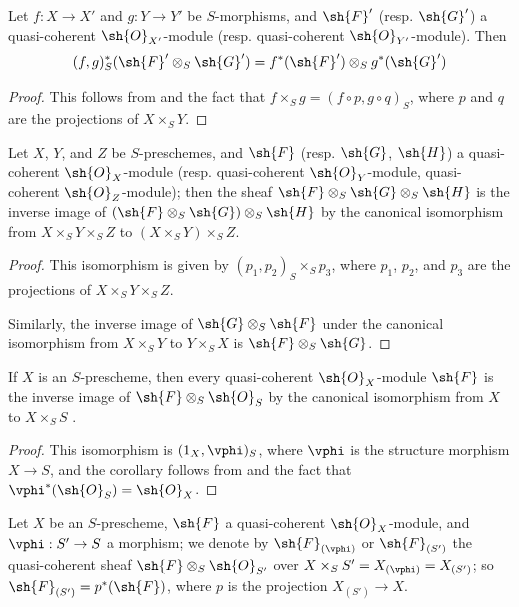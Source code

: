 \begin{corollary}[9.1.5]
\label{I.9.1.5}
Let $f:X\to X'$ and $g:Y\to Y'$ be
$S$-morphisms, and $\sh{F}'$ (resp. $\sh{G}'$) a quasi-coherent
$\sh{O}_{X'}$-module (resp. quasi-coherent $\sh{O}_{Y'}$-module). Then
\[
  (f,g)^*_S(\sh{F}'\otimes_S\sh{G}')=f^*(\sh{F}')\otimes_S g^*(\sh{G}')
\]
\end{corollary}

\begin{proof}
This follows from  and the fact that $f\times_S g=(f\circ p, g\circ q)_S$,
where $p$ and $q$ are the projections of $X\times_S Y$.
\end{proof}

\begin{corollary}[9.1.6]
\label{I.9.1.6}
Let $X$, $Y$, and $Z$ be $S$-preschemes, and $\sh{F}$ (resp. $\sh{G}$, $\sh{H}$) a
quasi-coherent $\sh{O}_X$-module (resp. quasi-coherent $\sh{O}_Y$-module, quasi-coherent
$\sh{O}_Z$-module); then the sheaf $\sh{F}\otimes_S\sh{G}\otimes_S\sh{H}$ is the inverse image
of $(\sh{F}\otimes_S\sh{G})\otimes_S\sh{H}$ by the canonical isomorphism from
$X\times_S Y\times_S Z$ to $(X\times_S Y)\times_S Z$.
\end{corollary}

\begin{proof}
This isomorphism is given by $(p_1,p_2)_S\times_S p_3$, where $p_1$, $p_2$, and $p_3$
are the projections of $X\times_S Y\times_S Z$.

Similarly, the inverse image of $\sh{G}\otimes_S\sh{F}$ under the canonical isomorphism from
$X\times_S Y$ to $Y\times_S X$ is $\sh{F}\otimes_S\sh{G}$.
\end{proof}

\begin{corollary}[9.1.7]
\label{I.9.1.7}
If $X$ is an $S$-prescheme, then every quasi-coherent $\sh{O}_X$-module $\sh{F}$ is the inverse
image of $\sh{F}\otimes_S\sh{O}_S$ by the canonical isomorphism from $X$ to $X\times_S S$
.
\end{corollary}

\begin{proof}
This isomorphism is $(1_X,\vphi)_S$, where $\vphi$ is the structure morphism
$X\to S$, and the corollary follows from  and the fact that
$\vphi^*(\sh{O}_S)=\sh{O}_X$.
\end{proof}

\begin{env}[9.1.8]
\label{I.9.1.8}
Let $X$ be an $S$-prescheme, $\sh{F}$ a quasi-coherent
$\sh{O}_X$-module, and $\vphi:S'\to S$ a morphism; we denote by
$\sh{F}_{(\vphi)}$ or $\sh{F}_{(S')}$ the quasi-coherent sheaf
$\sh{F}\otimes_S\sh{O}_{S'}$ over $X\times_S S'=X_{(\vphi)}=X_{(S')}$; so
$\sh{F}_{(S')}=p^*(\sh{F})$, where $p$ is the projection $X_{(S')}\to X$.
\end{env}

